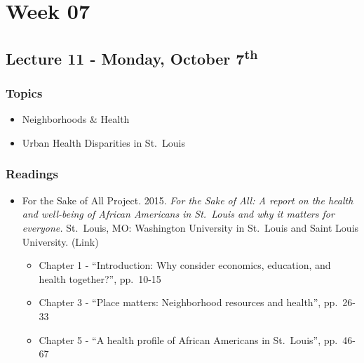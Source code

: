 \documentclass[]{book}
\providecommand{\tightlist}{%
  \setlength{\itemsep}{0pt}\setlength{\parskip}{0pt}}
\begin{document}
\newpage

\hypertarget{week-07}{%
\section*{Week 07}\label{week-07}}

\hypertarget{lecture-11---monday-october-7th}{%
\subsection*{\texorpdfstring{Lecture 11 - Monday, October 7\textsuperscript{th}}{Lecture 11 - Monday, October 7th}}\label{lecture-11---monday-october-7th}}

\hypertarget{topics-12}{%
\subsubsection*{Topics}\label{topics-12}}

\begin{itemize}
\tightlist
\item
  Neighborhoods \& Health
\item
  Urban Health Disparities in St.~Louis
\end{itemize}

\hypertarget{readings-11}{%
\subsubsection*{Readings}\label{readings-11}}

\begin{itemize}
\tightlist
\item
  For the Sake of All Project. 2015. \emph{For the Sake of All: A report on the health and well-being of African Americans in St.~Louis and why it matters for everyone.} St.~Louis, MO: Washington University in St.~Louis and Saint Louis University. (Link)

  \begin{itemize}
  \tightlist
  \item
    Chapter 1 - ``Introduction: Why consider economics, education, and health together?'', pp.~10-15
  \item
    Chapter 3 - ``Place matters: Neighborhood resources and health'', pp.~26-33
  \item
    Chapter 5 - ``A health profile of African Americans in St.~Louis'', pp.~46-67
  \end{itemize}
\end{itemize}
\end{document}
